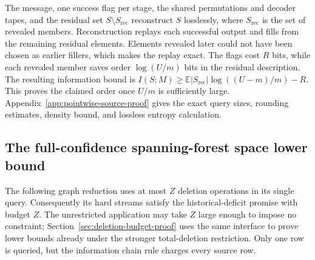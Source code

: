\documentclass[11pt,letterpaper]{article}
\numberwithin{equation}{section}
\newcommand{\E}{\mathbb E}
\begin{document}
The message, one success flag per stage, the shared permutations and decoder tapes, and the residual set $S\setminus S_{\mathrm{rec}}$ reconstruct $S$ losslessly, where $S_{\mathrm{rec}}$ is the set of revealed members.
Reconstruction replays each successful output and fills from the remaining residual elements.
Elements revealed later could not have been chosen as earlier fillers, which makes the replay exact.
The flags cost $R$ bits, while each revealed member saves order $\log(U/m)$ bits in the residual description.
The resulting information bound is $I(S;M)\ge\E|S_{\mathrm{rec}}|\log((U-m)/m)-R$.
This proves the claimed order once $U/m$ is sufficiently large.
Appendix~\ref{app:pointwise-source-proof} gives the exact query sizes, rounding estimates, density bound, and lossless entropy calculation.

\subsection{The full-confidence spanning-forest space lower bound}
\label{sec:indexed-confidence}

The following graph reduction uses at most $Z$ deletion operations in its single query.
Consequently its hard streams satisfy the historical-deficit promise with budget $Z$.
The unrestricted application may take $Z$ large enough to impose no constraint; Section~\ref{sec:deletion-budget-proof} uses the same interface to prove lower bounds already under the stronger total-deletion restriction.
Only one row is queried, but the information chain rule charges every source row.
\end{document}
